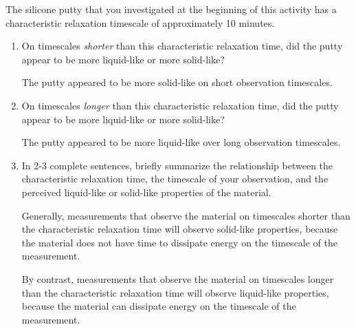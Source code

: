 \begin{activity}
\begin{ctqs}
\begin{solution}[1.5in]
					\end{solution}
					
		\question The silicone putty that you investigated at the beginning of this activity has a characteristic relaxation timescale of approximately 10 minutes.
		
			\begin{enumerate}
				\item On timescales \emph{shorter} than this characteristic relaxation time, did the putty appear to be more liquid-like or more solid-like?
	
					\begin{solution}[0.75in]
					
						The putty appeared to be more solid-like on short observation timescales.
						
					\end{solution}
				
				\item On timescales \emph{longer} than this characteristic relaxation time, did the putty appear to be more liquid-like or more solid-like?
	
					\begin{solution}[0.75in]
					
						The putty appeared to be more liquid-like over long observation timescales.
						
					\end{solution}
				
				\item In 2-3 complete sentences, briefly summarize the relationship between the characteristic relaxation time, the timescale of your observation, and the perceived liquid-like or solid-like properties of the material.
	
					\begin{solution}[2.5in]
					
						Generally, measurements that observe the material on timescales shorter than the characteristic relaxation time will observe solid-like properties, because the material does not have time to dissipate energy on the timescale of the measurement.
						
						By contrast, measurements that observe the material on timescales longer than the characteristic relaxation time will observe liquid-like properties, because the material can dissipate energy on the timescale of the measurement.
					
					\end{solution}
			\end{enumerate}
		

\end{ctqs}
\end{activity}
